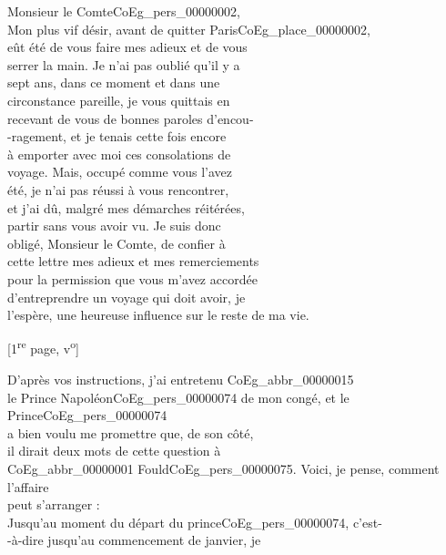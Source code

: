 \documentclass{book}
\begin{document}
\hspace{1cm} Monsieur le Comte\gls{CoEg_pers_00000002},\\

Mon plus vif désir, avant de quitter Paris\gls{CoEg_place_00000002},\\
eût été de vous faire mes adieux et de vous\\
serrer la main. Je n’ai pas oublié qu'il y a\\
sept ans, dans ce moment et dans une\\
circonstance pareille, je vous quittais en\\
recevant de vous de bonnes paroles d’encou-\\
-ragement, et je tenais cette fois encore\\
à emporter avec moi ces consolations de\\
voyage. Mais, occupé comme vous l’avez\\
été, je n’ai pas réussi à vous rencontrer,\\
et j’ai dû, malgré mes démarches réitérées,\\
partir sans vous avoir vu. Je suis donc\\
obligé, Monsieur le Comte, de confier à\\
cette lettre mes adieux et mes remerciements\\
pour la permission que vous m’avez accordée\\
d’entreprendre un voyage qui doit avoir, je\\
l’espère, une heureuse influence sur le reste de ma vie.
{\footnotesize\begin{center} {[1\textsuperscript{re} page, v\textsuperscript{o}]}\end{center}}
\indent D’après vos instructions, j’ai entretenu \gls{CoEg_abbr_00000015}\\
le Prince Napoléon\gls{CoEg_pers_00000074} de mon congé, et le Prince\gls{CoEg_pers_00000074}\\
a bien voulu me promettre que, de son côté,\\
il dirait deux mots de cette question à\\
\gls{CoEg_abbr_00000001} Fould\gls{CoEg_pers_00000075}. Voici, je pense, comment l’affaire\\
peut s’arranger :\\
\indent Jusqu’au moment du départ du prince\gls{CoEg_pers_00000074}, c’est-\\
-à-dire jusqu’au commencement de janvier, je\\
\end{document}
